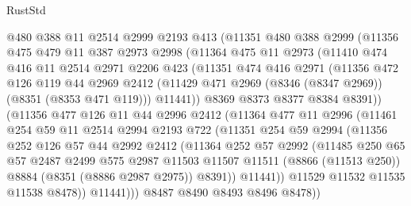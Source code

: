 \begin{lexlean}{RustStd}
\begin{coremodule}
        @480
        @388
        @11
        @2514
        @2999
        @2193
        @413
        (@11351
          @480
          @388
          @2999
          (@11356
            @475
            @479
            @11
            @387
            @2973
            @2998
            (@11364
              @475
              @11
              @2973
              (@11410
                @474
                @416
                @11
                @2514
                @2971
                @2206
                @423
                (@11351
                  @474
                  @416
                  @2971
                  (@11356
                    @472
                    @126
                    @119
                    @44
                    @2969
                    @2412
                    (@11429 @471 @2969 (@8346 (@8347 @2969)) (@8351 (@8353 @471 @119)))
                    @11441))
                @8369
                @8373
                @8377
                @8384
                @8391))
            (@11356
              @477
              @126
              @11
              @44
              @2996
              @2412
              (@11364
                @477
                @11
                @2996
                (@11461
                  @254
                  @59
                  @11
                  @2514
                  @2994
                  @2193
                  @722
                  (@11351
                    @254
                    @59
                    @2994
                    (@11356
                      @252
                      @126
                      @57
                      @44
                      @2992
                      @2412
                      (@11364
                        @252
                        @57
                        @2992
                        (@11485
                          @250
                          @65
                          @57
                          @2487
                          @2499
                          @575
                          @2987
                          @11503
                          @11507
                          @11511
                          (@8866 (@11513 @250))
                          @8884
                          (@8351 (@8886 @2987 @2975))
                          @8391))
                      @11441))
                  @11529
                  @11532
                  @11535
                  @11538
                  @8478))
              @11441)))
        @8487
        @8490
        @8493
        @8496
        @8478))

\end{coremodule}
\end{lexlean}
